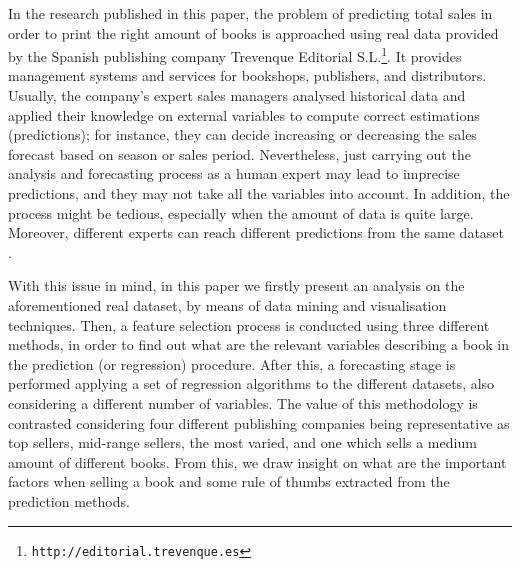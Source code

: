 \documentclass[a4paper,10pt,twocolumn,preprint,3p]{elsarticle}
\begin{document}
In the research published in this paper, the problem 
of predicting total sales in order to print the right amount of books
is approached using real data provided by the 
Spanish publishing company Trevenque Editorial S.L.\footnote{{\tt http://editorial.trevenque.es}}. It provides management systems and services for bookshops, publishers, and distributors. 
Usually, the company's expert sales managers analysed historical data
and applied their knowledge on external variables to compute correct
estimations (predictions); for instance, they can decide increasing or
decreasing the sales forecast based on season or sales period. 
Nevertheless, just carrying out the analysis and forecasting process
as a human expert may lead to imprecise predictions, and they may not
take all the variables into account.  
In addition, the process might be tedious, especially when the amount
of data is quite large. Moreover, different experts can reach different
predictions from the same dataset \cite{Sanders1994}. 


With this issue in mind, in this paper we firstly present an analysis
on the aforementioned real dataset, by means of data mining and
visualisation techniques. Then, a feature selection process is
conducted using three different methods, in order to find out what are
the relevant variables describing a book in the prediction (or
regression) procedure. After this, a forecasting stage is performed
applying a set of regression algorithms to the different datasets,
also considering a different number of variables. 
The value of this methodology is contrasted considering four different
publishing companies being representative as top sellers, mid-range
sellers, the most varied, and one which sells a medium amount of
different books. From this, we draw insight on what are the important
factors when selling a book and some rule of thumbs extracted from the
prediction methods.
\end{document}
